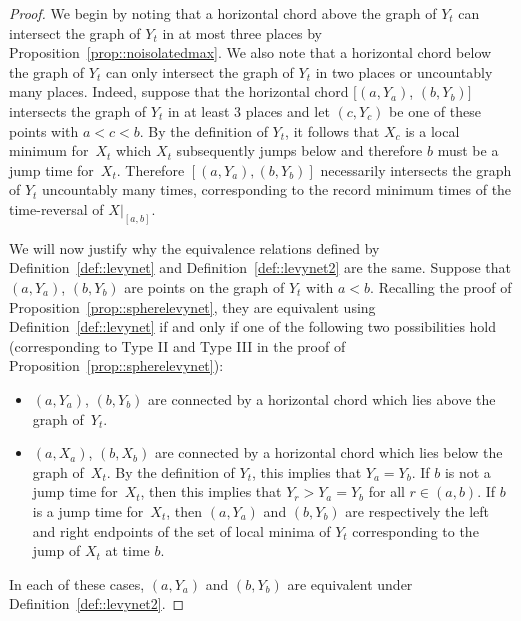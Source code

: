 \documentclass[JEP,XML,SOM,Unicode]{cedram}
\theoremstyle{plain}
\numberwithin{theorem}{section}
\theoremstyle{definition}
\begin{document}
\begin{proof}

We begin by noting that a horizontal chord above the graph of $Y_t$ can intersect the graph of $Y_t$ in at most three places by Proposition~\ref{prop::noisolatedmax}. We also note that a horizontal chord below the graph of $Y_t$ can only intersect the graph of $Y_t$ in two places or uncountably many places. Indeed, suppose that the horizontal chord $[(a,Y_a)$, $(b,Y_b)]$ intersects the graph of $Y_t$ in at least $3$ places and let $(c,Y_c)$ be one of these points with $a < c < b$. By the definition of $Y_t$, it follows that $X_c$ is a local minimum for~$X_t$ which $X_t$ subsequently jumps below and therefore $b$ must be a jump time for~$X_t$. Therefore $[(a,Y_a),(b,Y_b)]$ necessarily intersects the graph of $Y_t$ uncountably many times, corresponding to the record minimum times of the time-reversal of $X|_{[a,b]}$.

We will now justify why the equivalence relations defined by Definition~\ref{def::levynet} and Definition~\ref{def::levynet2} are the same. Suppose that $(a,Y_a)$, $(b,Y_b)$ are points on the graph of $Y_t$ with $a < b$. Recalling the proof of Proposition~\ref{prop::spherelevynet}, they are equivalent using Definition~\ref{def::levynet} if and only if one of the following two possibilities hold (corresponding to Type II and Type III in the proof of Proposition~\ref{prop::spherelevynet}):
\begin{itemize}
\item $(a,Y_a)$, $(b,Y_b)$ are connected by a horizontal chord which lies above the graph of~$Y_t$.
\item $(a,X_a)$, $(b,X_b)$ are connected by a horizontal chord which lies below the graph of~$X_t$. By the definition of $Y_t$, this implies that $Y_a = Y_b$. If $b$ is not a jump time for~$X_t$, then this implies that $Y_r > Y_a = Y_b$ for all $r \in (a,b)$. If $b$ is a jump time for~$X_t$, then $(a,Y_a)$ and $(b,Y_b)$ are respectively the left and right endpoints of the set of local minima of $Y_t$ corresponding to the jump of $X_t$ at time $b$.
\end{itemize}
In each of these cases, $(a,Y_a)$ and $(b,Y_b)$ are equivalent under Definition~\ref{def::levynet2}.


\end{proof}
\end{document}
